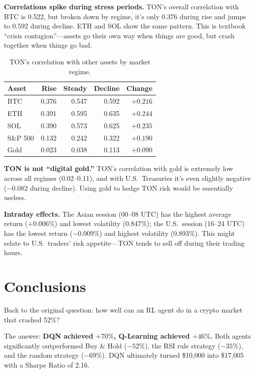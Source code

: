 \documentclass[11pt,a4paper]{article}
\begin{document}
\textbf{Correlations spike during stress periods.} TON's overall correlation with BTC is 0.522, but broken down by regime, it's only 0.376 during rise and jumps to 0.592 during decline. ETH and SOL show the same pattern. This is textbook ``crisis contagion''---assets go their own way when things are good, but crash together when things go bad.

\begin{table}[H]
\centering
\caption{TON's correlation with other assets by market regime.}
\label{tab:corr}
\begin{tabular}{lrrrr}
\toprule
Asset & Rise & Steady & Decline & Change \\
\midrule
BTC     & 0.376 & 0.547 & 0.592 & $+0.216$ \\
ETH     & 0.391 & 0.595 & 0.635 & $+0.244$ \\
SOL     & 0.390 & 0.573 & 0.625 & $+0.235$ \\
S\&P 500 & 0.132 & 0.242 & 0.322 & $+0.190$ \\
Gold    & 0.023 & 0.038 & 0.113 & $+0.090$ \\
\bottomrule
\end{tabular}
\end{table}

\textbf{TON is not ``digital gold.''} TON's correlation with gold is extremely low across all regimes (0.02--0.11), and with U.S.\ Treasuries it's even slightly negative ($-0.082$ during decline). Using gold to hedge TON risk would be essentially useless.

\textbf{Intraday effects.} The Asian session (00--08 UTC) has the highest average return ($+0.006\%$) and lowest volatility (0.847\%); the U.S.\ session (16--24 UTC) has the lowest return ($-0.009\%$) and highest volatility (0.893\%). This might relate to U.S.\ traders' risk appetite---TON tends to sell off during their trading hours.

\section{Conclusions}

Back to the original question: how well can an RL agent do in a crypto market that crashed 52\%?

The answer: \textbf{DQN achieved $+70\%$, Q-Learning achieved $+46\%$.} Both agents significantly outperformed Buy \& Hold ($-52\%$), the RSI rule strategy ($-35\%$), and the random strategy ($-69\%$). DQN ultimately turned \$10,000 into \$17,005 with a Sharpe Ratio of 2.16.
\end{document}
